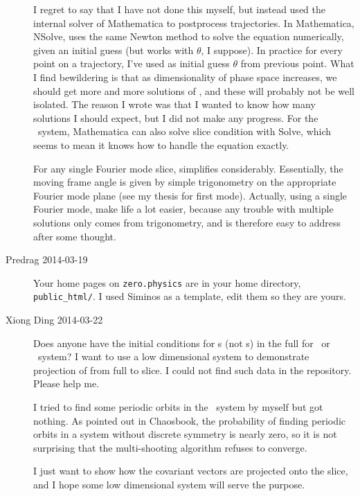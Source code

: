\begin{description}
I regret to say that I have not done this myself, but instead used the internal solver of Mathematica to
postprocess trajectories. In Mathematica, NSolve, uses the same Newton method to solve the equation numerically,
given an initial guess (but works with $\theta$, I suppose).
In practice for every point on a trajectory, I've used as initial guess $\theta$
from previous point. What I find bewildering is that as dimensionality of phase space increases, we should
get more and more solutions of , and these will probably not be well isolated.
The reason I wrote  was that I wanted to know how many solutions I should expect,
but I did not make any progress. For the \twomode\ system, Mathematica can also solve slice condition
with Solve, which seems to mean it knows how to handle the equation exactly.

For any single Fourier mode slice,  simplifies considerably. Essentially, the
moving frame angle is given by simple trigonometry on the appropriate Fourier mode plane (see my thesis
for first mode). Actually, using
a single Fourier mode, make life a lot easier, because any trouble with multiple solutions only comes
from trigonometry, and is therefore easy to address after some thought.


\item[Predrag 2014-03-19] Your
 {home pages} on \texttt{zero.physics}
    are in your home directory, \texttt{public\_html/}. I used Siminos as a
    template, edit them so they are yours.

\item[Xiong Ding 2014-03-22]
Does anyone have the initial conditions for \po s
(not \rpo s) in the full {\statesp} for \cLe\ or
\twomode\ system? I want to use a low dimensional system to demonstrate
projection of {\cLvs} from full {\statesp} to slice. I could
not find such data in the repository. Please help me.

I tried to find some periodic orbits in the \twomode\ system by myself
but got nothing. As pointed out in Chaosbook, the probability of finding
periodic orbits in a system without discrete symmetry is nearly zero, so
it is not surprising that the multi-shooting algorithm refuses to
converge.

I just want to show how the covariant vectors are projected onto the
slice, and I hope some low dimensional system will serve the purpose.


\end{description}
